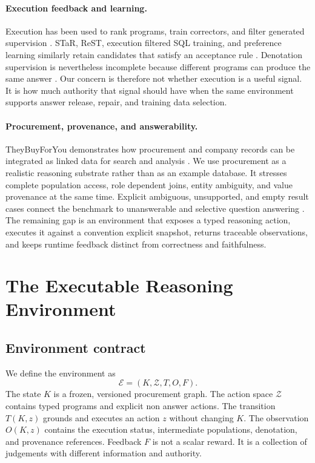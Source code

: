 \documentclass{article}
\begin{document}
\paragraph{Execution feedback and learning.}
Execution has been used to rank programs, train correctors, and filter generated supervision
\citep{ni2023lever,wang2021executions,zhu2026scd}.  STaR, ReST, execution filtered SQL training,
and preference learning similarly retain candidates that satisfy an acceptance rule
\citep{zelikman2022star,gulcehre2023rest,zhang2025exesql,zhai2025excot}.  Denotation supervision is
nevertheless incomplete because different programs can produce the same answer
\citep{pasupat2016denotations,lee2023spurious}.  Our concern is therefore not whether execution is a
useful signal.  It is how much authority that signal should have when the same environment supports
answer release, repair, and training data selection.

\paragraph{Procurement, provenance, and answerability.}
TheyBuyForYou demonstrates how procurement and company records can be integrated as linked data
for search and analysis \citep{soylu2022theybuyforyou}.  We use procurement as a realistic
reasoning substrate rather than as an example database.  It stresses complete population access,
role dependent joins, entity ambiguity, and value provenance at the same time.  Explicit ambiguous,
unsupported, and empty result cases connect the benchmark to unanswerable and selective question
answering \citep{rajpurkar2018know,kamath2020selective}.  The remaining gap is an environment that
exposes a typed reasoning action, executes it against a convention explicit snapshot, returns
traceable observations, and keeps runtime feedback distinct from correctness and faithfulness.

\section{The Executable Reasoning Environment}
\label{sec:contract}

\subsection{Environment contract}

We define the environment as
\begin{equation}
  \mathcal{E}=(K,\mathcal{Z},T,O,F).
  \label{eq:environment}
\end{equation}
The state $K$ is a frozen, versioned procurement graph.  The action space $\mathcal{Z}$ contains
typed programs and explicit non answer actions.  The transition $T(K,z)$ grounds and executes an
action $z$ without changing $K$.  The observation $O(K,z)$ contains the execution status,
intermediate populations, denotation, and provenance references.  Feedback $F$ is not a scalar
reward.  It is a collection of judgements with different information and authority.
\end{document}
